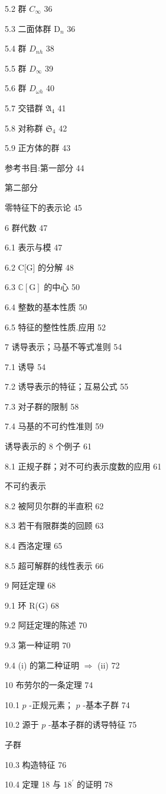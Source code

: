 \documentclass[10pt]{article}
\begin{document}
5.2 群 \({C}_{\infty }\) 36

5.3 二面体群 \({\mathrm{D}}_{n}\) 36

5.4 群 \({D}_{nh}\) 38

5.5 群 \({D}_{\infty }\) 39

5.6 群 \({D}_{\omega h}\) 40

5.7 交错群 \({\mathfrak{A}}_{4}\) 41

5.8 对称群 \({\mathfrak{S}}_{4}\) 42

5.9 正方体的群 43

参考书目:第一部分 44

第二部分

零特征下的表示论 45

6 群代数 47

6.1 表示与模 47

6.2 C[G] 的分解 48

6.3 \(\mathbb{C}\left\lbrack  \mathrm{G}\right\rbrack\) 的中心 50

6.4 整数的基本性质 50

6.5 特征的整性性质.应用 52

7 诱导表示；马基不等式准则 54

7.1 诱导 54

7.2 诱导表示的特征；互易公式 55

7.3 对子群的限制 58

7.4 马基的不可约性准则 59

诱导表示的 8 个例子 61

8.1 正规子群；对不可约表示度数的应用 61

不可约表示

8.2 被阿贝尔群的半直积 62

8.3 若干有限群类的回顾 63

8.4 西洛定理 65

8.5 超可解群的线性表示 66

9 阿廷定理 68

9.1 环 R(G) 68

9.2 阿廷定理的陈述 70

9.3 第一种证明 70

9.4 (i) 的第二种证明 \(\Rightarrow\) (ii) 72

10 布劳尔的一条定理 74

10.1 \(p\) -正规元素； \(p\) -基本子群 74

10.2 源于 \(p\) -基本子群的诱导特征 75

子群

10.3 构造特征 76

10.4 定理 18 与 \({18}^{\prime }\) 的证明 78
\end{document}
